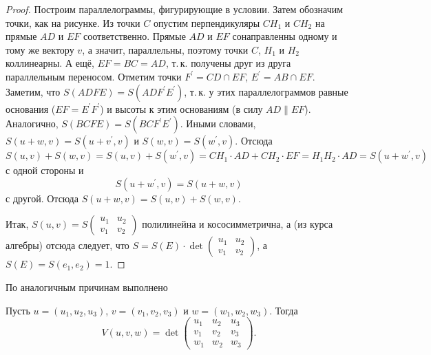 \begin{proof}
    Построим параллелограммы, фигурирующие в условии. Затем обозначим точки, как на рисунке. Из точки $C$ опустим перпендикуляры $CH_1$ и $CH_2$ на прямые $AD$ и $EF$ соответственно. Прямые $AD$ и $EF$ сонаправленны одному и тому же вектору $v$, а значит, параллельны, поэтому точки $C$, $H_1$ и $H_2$ коллинеарны. А ещё, $EF = BC = AD$, т.\,к. получены друг из друга параллельным переносом. Отметим точки $F^\prime = CD \cap EF$, $E^\prime = AB \cap EF$. Заметим, что $S(ADFE) = S(ADF^\prime E^\prime)$, т.\,к. у этих параллелограммов равные основания ($EF = E^\prime F^\prime$) и высоты к этим основаниям (в силу $AD \parallel EF$). Аналогично, $S(BCFE) = S(BCF^\prime E^\prime)$. Иными словами, $S(u + w, v) = S(u + v^\prime, v)$ и $S(w, v) = S(w^\prime, v)$. Отсюда
    $$S(u, v) + S(w, v) = S(u, v) + S(w^\prime, v) = CH_1 \cdot AD + CH_2 \cdot EF = H_1H_2 \cdot AD = S(u + w^\prime, v)$$
    с одной стороны и
    $$S(u + w^\prime, v) = S(u + w, v)$$
    с другой. Отсюда $S(u + w, v) = S(u, v) + S(w, v)$.

    Итак, $S(u, v) = S
    \begin{pmatrix}
        u_1 & u_2\\
        v_1 & v_2
    \end{pmatrix}$ полилинейна и кососимметрична, а (из курса алгебры) отсюда следует, что $S = S(E) \cdot \det
    \begin{pmatrix}
        u_1 & u_2\\
        v_1 & v_2
    \end{pmatrix}$, а $S(E) = S(e_1, e_2) = 1$.
\end{proof}

По аналогичным причинам выполнено

\begin{statement}
    Пусть $u = (u_1, u_2, u_3)$, $v = (v_1, v_2, v_3)$ и $w = (w_1, w_2, w_3)$. Тогда
    $$
    V(u, v, w) = \det
    \begin{pmatrix}
        u_1 & u_2 & u_3\\
        v_1 & v_2 & v_3\\
        w_1 & w_2 & w_3
    \end{pmatrix}.
    $$
\end{statement}


